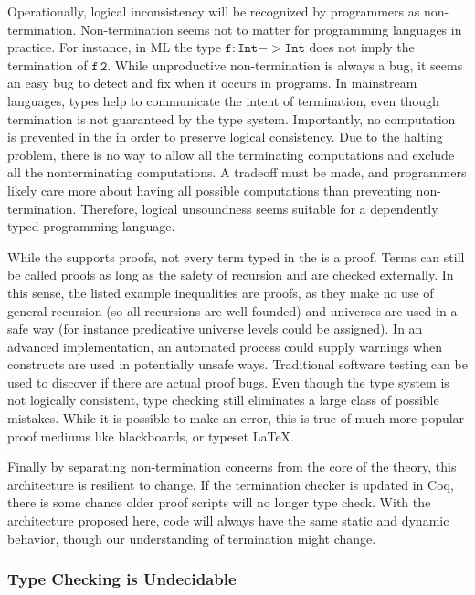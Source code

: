 Operationally, logical inconsistency will be recognized by programmers as non-termination.
Non-termination seems not to matter for programming languages in practice.
For instance, in ML the type $\mathtt{f:Int->Int}$ does not imply the termination of $\mathtt{f\,2}$.
While unproductive non-termination is always a bug, it seems an easy bug to detect and fix when it occurs in programs.
In mainstream languages, types help to communicate the intent of termination, even though termination is not guaranteed by the type system.
Importantly, no computation is prevented in the \slang{} in order to preserve logical consistency.
Due to the halting problem, there is no way to allow all the terminating computations and exclude all the nonterminating computations.
A tradeoff must be made, and programmers likely care more about having all possible computations than preventing non-termination.
Therefore, logical unsoundness seems suitable for a dependently typed programming language.
 
 
 
While the \slang{} supports proofs, not every term typed in the \slang{} is a proof.
Terms can still be called proofs as long as the safety of recursion and \tit{} are checked externally.
In this sense, the listed example inequalities are proofs, as they make no use of general recursion (so all recursions are well founded) and universes are used in a safe way (for instance predicative universe levels could be assigned).
In an advanced implementation, an automated process could supply warnings when constructs are used in potentially unsafe ways.
Traditional software testing can be used to discover if there are actual proof bugs.
Even though the type system is not logically consistent, type checking still eliminates a large class of possible mistakes.
While it is possible to make an error, this is true of much more popular proof mediums like blackboards, or typeset \LaTeX.
 
Finally by separating non-termination concerns from the core of the theory, this architecture is resilient to change.
If the termination checker is updated in Coq, there is some chance older proof scripts will no longer type check.
With the architecture proposed here, code will always have the same static and dynamic behavior, though our understanding of termination might change.
 
\subsubsection{Type Checking is Undecidable}

